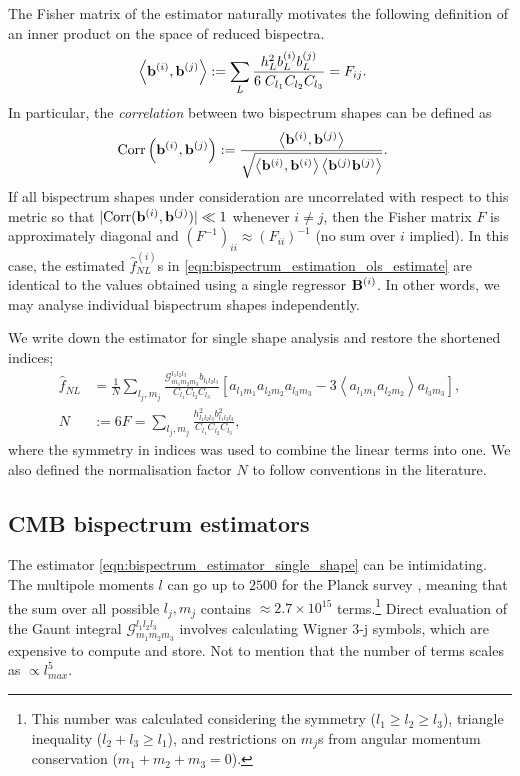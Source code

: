 The Fisher matrix of the estimator naturally motivates the following definition of an inner product on the space of reduced bispectra.
\begin{align}
	\left< \mathbf{b}^{(i)}, \mathbf{b}^{(j)} \right> &:= \sum_L \frac{h^2_L b^{(i)}_L b^{(j)}_L}{6 \; C_{l_1} C_{l_2} C_{l_3}}  = F_{ij}.	\label{def:bispectrum_estimation_fisher_inner_product}
\end{align}
In particular, the \textit{correlation} between two bispectrum shapes can be defined as
\begin{align}
	\text{Corr} \left( \mathbf{b}^{(i)}, \mathbf{b}^{(j)} \right) &:= \frac{ \left< \mathbf{b}^{(i)}, \mathbf{b}^{(j)} \right>}{\sqrt{ \left< \mathbf{b}^{(i)}, \mathbf{b}^{(i)} \right> \left< \mathbf{b}^{(j)} \mathbf{b}^{(j)} \right> }}.
\end{align}
If all bispectrum shapes under consideration are uncorrelated with respect to this metric so that $| \text{Corr}(\mathbf{b}^{(i)}, \mathbf{b}^{(j)}) | \ll 1$ whenever $i \neq j$, then the Fisher matrix $F$ is approximately diagonal and $(F^{-1})_{ii} \approx (F_{ii})^{-1}$ (no sum over $i$ implied). In this case, the estimated $\hat{f}_{NL}^{(i)}$s in \eqref{eqn:bispectrum_estimation_ols_estimate} are identical to the values obtained using a single regressor $\mathbf{B}^{(i)}$. In other words, we may analyse individual bispectrum shapes independently.

We write down the estimator for single shape analysis and restore the shortened indices;
\begin{align}
	\hat{f}_{NL} &= \frac{1}{N} \sum_{l_j,m_j} \frac{\mathcal{G}^{l_1 l_2 l_3}_{m_1 m_2 m_3} b_{l_1 l_2 l_3}}{C_{l_1} C_{l_2} C_{l_3}} \left[ a_{l_1 m_1} a_{l_2 m_2} a_{l_3 m_3} - 3\left< a_{l_1 m_1} a_{l_2 m_2} \right> a_{l_3 m_3} \right], \label{eqn:bispectrum_estimator_single_shape} \\
	N &:= 6F = \sum_{l_j,m_j} \frac{h^2_{l_1 l_2 l_3} b^2_{l_1 l_2 l_3}}{C_{l_1} C_{l_2} C_{l_3}}, \label{eqn:bispectrum_estimator_normalisation_single_shape}
\end{align}
where the symmetry in indices was used to combine the linear terms into one. We also defined the normalisation factor $N$ to follow conventions in the literature. 

\subsection{CMB bispectrum estimators}
The estimator \eqref{eqn:bispectrum_estimator_single_shape} can be intimidating. The multipole moments $l$ can go up to $2500$ for the Planck survey \cite{PlanckCollaboration2013paramters}, meaning that the sum over all possible $l_j, m_j$ contains $\approx 2.7\times 10^{15}$ terms.\footnote{This number was calculated considering the symmetry ($l_1 \ge l_2 \ge l_3$), triangle inequality ($l_2+l_3 \ge l_1$), and restrictions on $m_j$s from angular momentum conservation ($m_1+m_2+m_3=0$). } Direct evaluation of the Gaunt integral $\mathcal{G}^{l_1 l_2 l_3}_{m_1 m_2 m_3}$ involves calculating Wigner 3-j symbols, which are expensive to compute and store. Not to mention that the number of terms scales as $\propto l_{max}^5$.


